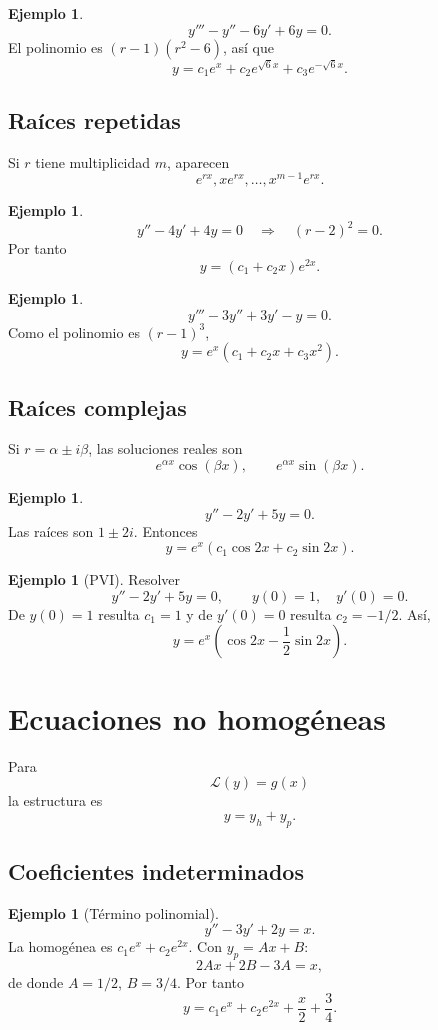 \documentclass[11pt]{article}
\theoremstyle{definition}
\newtheorem{ejemplo}[teorema]{Ejemplo}
\begin{document}
\begin{ejemplo}
\[
y'''-y''-6y'+6y=0.
\]
El polinomio es $(r-1)(r^2-6)$, así que
\[
\boxed{y=c_1e^x+c_2e^{\sqrt6x}+c_3e^{-\sqrt6x}}.
\]
\end{ejemplo}

\subsection{Raíces repetidas}
Si $r$ tiene multiplicidad $m$, aparecen
\[
e^{rx},xe^{rx},\ldots,x^{m-1}e^{rx}.
\]

\begin{ejemplo}
\[
y''-4y'+4y=0
\quad\Longrightarrow\quad
(r-2)^2=0.
\]
Por tanto
\[
\boxed{y=(c_1+c_2x)e^{2x}}.
\]
\end{ejemplo}

\begin{ejemplo}
\[
y'''-3y''+3y'-y=0.
\]
Como el polinomio es $(r-1)^3$,
\[
\boxed{y=e^x(c_1+c_2x+c_3x^2)}.
\]
\end{ejemplo}

\subsection{Raíces complejas}
Si $r=\alpha\pm i\beta$, las soluciones reales son
\[
e^{\alpha x}\cos(\beta x),\qquad
e^{\alpha x}\sin(\beta x).
\]

\begin{ejemplo}
\[
y''-2y'+5y=0.
\]
Las raíces son $1\pm2i$. Entonces
\[
\boxed{y=e^x(c_1\cos2x+c_2\sin2x)}.
\]
\end{ejemplo}

\begin{ejemplo}[PVI]
Resolver
\[
y''-2y'+5y=0,\qquad y(0)=1,\quad y'(0)=0.
\]
De $y(0)=1$ resulta $c_1=1$ y de $y'(0)=0$ resulta $c_2=-1/2$. Así,
\[
\boxed{y=e^x\left(\cos2x-\frac12\sin2x\right)}.
\]
\end{ejemplo}

\section{Ecuaciones no homogéneas}
Para
\[
\mathcal L(y)=g(x)
\]
la estructura es
\[
\boxed{y=y_h+y_p}.
\]

\subsection{Coeficientes indeterminados}
\begin{ejemplo}[Término polinomial]
\[
y''-3y'+2y=x.
\]
La homogénea es $c_1e^x+c_2e^{2x}$. Con $y_p=Ax+B$:
\[
2Ax+2B-3A=x,
\]
de donde $A=1/2$, $B=3/4$. Por tanto
\[
\boxed{y=c_1e^x+c_2e^{2x}+\frac{x}{2}+\frac34}.
\]
\end{ejemplo}
\end{document}
